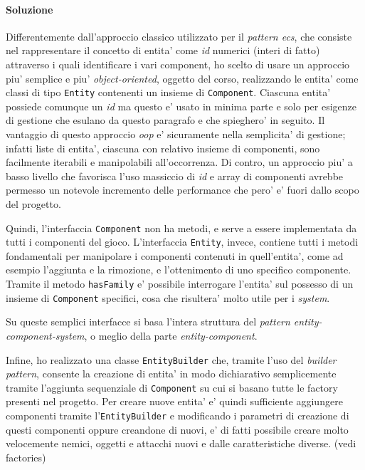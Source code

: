 \documentclass[a4paper,12pt]{report}
\begin{document}
\paragraph*{Soluzione}
Differentemente dall'approccio classico utilizzato per il \textit{pattern ecs}, che consiste nel rappresentare il concetto di entita' come \textit{id} numerici (interi di fatto) attraverso i quali identificare i vari component, ho scelto di usare un approccio piu' semplice e piu' \textit{object-oriented}, oggetto del corso, realizzando le entita' come classi di tipo \texttt{Entity} contenenti un insieme di \texttt{Component}. Ciascuna entita' possiede comunque un \textit{id} ma questo e' usato in minima parte e solo per esigenze di gestione che esulano da questo paragrafo e che spieghero' in seguito. 
Il vantaggio di questo approccio \textit{oop} e' sicuramente nella semplicita' di gestione; infatti liste di entita', ciascuna con relativo insieme di componenti, sono facilmente iterabili e manipolabili all'occorrenza. Di contro, un approccio piu' a basso livello che favorisca l'uso massiccio di \textit{id} e array di componenti avrebbe permesso un notevole incremento delle performance che pero' e' fuori dallo scopo del progetto.

Quindi, l'interfaccia \texttt{Component} non ha metodi, e serve a essere implementata da tutti i componenti del gioco.
L'interfaccia \texttt{Entity}, invece, contiene tutti i metodi fondamentali per manipolare i componenti contenuti in quell'entita', come ad esempio l'aggiunta e la rimozione, e l'ottenimento di uno specifico componente. Tramite il metodo \texttt{hasFamily} e' possibile interrogare l'entita' sul possesso di un insieme di \texttt{Component} specifici, cosa che risultera' molto utile per i \textit{system}.

Su queste semplici interfacce si basa l'intera struttura del \textit{pattern entity-component-system}, o meglio della parte \textit{entity-component}.

Infine, ho realizzato una classe \texttt{EntityBuilder} che, tramite l'uso del \textit{builder pattern}, consente la creazione di entita' in modo dichiarativo semplicemente tramite l'aggiunta sequenziale di \texttt{Component} su cui si basano tutte le factory presenti nel progetto. Per creare nuove entita' e' quindi sufficiente aggiungere componenti tramite l'\texttt{EntityBuilder} e modificando i parametri di creazione di questi componenti oppure creandone di nuovi, e' di fatti possibile creare molto velocemente nemici, oggetti e attacchi nuovi e dalle caratteristiche diverse. (vedi factories)
\end{document}
